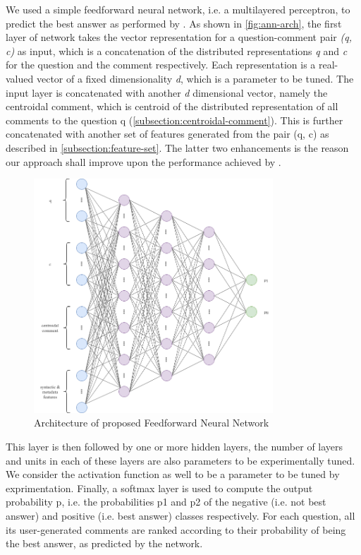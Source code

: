 \documentclass[12pt, a4paper, oneside]{Thesis} %
\begin{document}
We used a simple feedforward neural network, i.e. a multilayered perceptron, to predict the best answer as performed by \cite{bogdanova2016we}. As shown in \autoref{fig:ann-arch}, the first layer of network takes the vector representation for a question-comment pair \textit{(q, c)} as input, which is a concatenation of the distributed representations \textit{q} and \textit{c} for the question and the comment respectively. Each representation is a real-valued vector of a fixed dimensionality \textit{d}, which is a parameter to be tuned. The input layer is concatenated with another \textit{d} dimensional vector, namely the centroidal comment, which is centroid of the distributed representation of all comments to the question q (\autoref{subsection:centroidal-comment}). This is further concatenated with another set of features generated from the pair (q, c) as described in \autoref{subsection:feature-set}. The latter two enhancements is the reason our approach shall improve upon the performance achieved by \cite{bogdanova2016we}.

\begin{figure}[t!]
  \centering
  \includegraphics[keepaspectratio, width=0.8\textwidth]{./Pictures/ann-arch.png}
  \caption{Architecture of proposed Feedforward Neural Network}
  \label{fig:ann-arch}
\end{figure}

This layer is then followed by one or more hidden layers, the number of layers and units in each of these layers are also parameters to be experimentally tuned. We consider the activation function as well to be a parameter to be tuned by exprimentation. Finally, a softmax layer is used to compute the output probability p, i.e. the probabilities p1 and p2 of the negative (i.e. not best answer) and positive (i.e. best answer) classes respectively. For each question, all its user-generated comments are ranked according to their probability of being the best answer, as predicted by the network.
\end{document}
